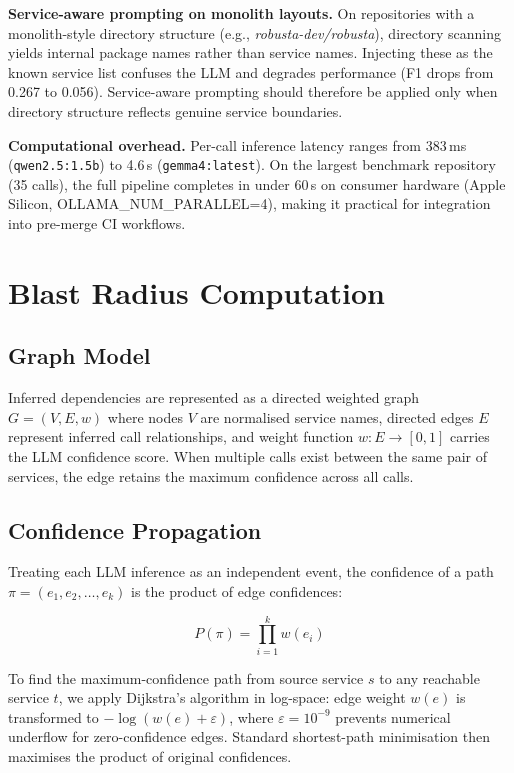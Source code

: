\documentclass[runningheads]{llncs}
\begin{document}
\textbf{Service-aware prompting on monolith layouts.} On repositories with
a monolith-style directory structure (e.g., \emph{robusta-dev/robusta}),
directory scanning yields internal package names rather than service names.
Injecting these as the known service list confuses the LLM and degrades
performance (F1 drops from 0.267 to 0.056). Service-aware prompting should
therefore be applied only when directory structure reflects genuine service
boundaries.

\textbf{Computational overhead.} Per-call inference latency ranges from
383\,ms (\texttt{qwen2.5:1.5b}) to 4.6\,s (\texttt{gemma4:latest}).
On the largest benchmark repository (35 calls), the full pipeline completes
in under 60\,s on consumer hardware (Apple Silicon, OLLAMA\_NUM\_PARALLEL=4),
making it practical for integration into pre-merge CI workflows.

\section{Blast Radius Computation}
\label{sec:blast}

\subsection{Graph Model}

Inferred dependencies are represented as a directed weighted graph
$G = (V, E, w)$ where nodes $V$ are normalised service names, directed
edges $E$ represent inferred call relationships, and weight function
$w: E \to [0,1]$ carries the LLM confidence score. When multiple calls
exist between the same pair of services, the edge retains the maximum
confidence across all calls.

\subsection{Confidence Propagation}

Treating each LLM inference as an independent event, the confidence of a
path $\pi = (e_1, e_2, \ldots, e_k)$ is the product of edge confidences:

\begin{equation}
  P(\pi) = \prod_{i=1}^{k} w(e_i)
\end{equation}

To find the maximum-confidence path from source service $s$ to any
reachable service $t$, we apply Dijkstra's algorithm in log-space:
edge weight $w(e)$ is transformed to $-\log(w(e) + \varepsilon)$, where
$\varepsilon = 10^{-9}$ prevents numerical underflow for zero-confidence
edges. Standard shortest-path minimisation then maximises the product of
original confidences.
\end{document}
